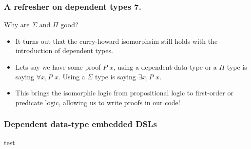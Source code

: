\documentclass{beamer}
\begin{document}
\begin{frame}[fragile]
  \frametitle{A refresher on dependent types 7.}
  \begin{block}{Why are $\Sigma$ and $\Pi$ good?}
  \begin{itemize}
    \item It turns out that the curry-howard isomorphsim
      still holds with the introduction of dependent types.
    \item Lets say we have some proof $P$ $x$, using a
      dependent-data-type or a $\Pi$ type is saying $\forall x, P$ $x$.
      Using a $\Sigma$ type is saying $\exists x, P$ $x$.
    \item This brings the isomorphic logic from propositional logic
      to first-order or predicate logic, allowing us to write proofs
      in our code!
  \end{itemize}
  \end{block}
\end{frame}

\begin{frame}[fragile]
  \frametitle{Dependent data-type embedded DSLs}
  \begin{block}{test}
  \end{block}
\end{frame}
\end{document}
